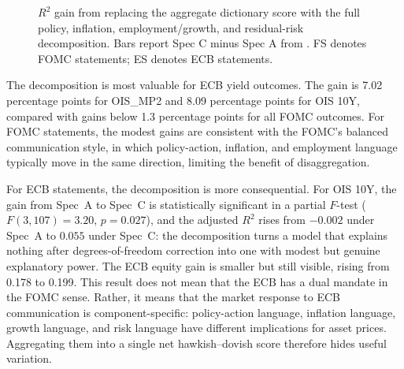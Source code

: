 \begin{figure}[H]
  \centering
  \caption[$R^2$ gains from decomposing dictionary tone]{$R^2$ gain from
    replacing the aggregate dictionary score with the full policy, inflation,
    employment/growth, and residual-risk decomposition. Bars report Spec C
    minus Spec A from . FS denotes FOMC
    statements; ES denotes ECB statements.}
  \label{fig:dual_mandate_r2_gains_v31}
\end{figure}


The decomposition is most valuable for ECB yield outcomes. The gain is 7.02
percentage points for OIS\_MP2 and 8.09 percentage points for OIS 10Y,
compared with gains below 1.3 percentage points for all FOMC outcomes. For
FOMC statements, the modest gains are consistent with the FOMC's balanced
communication style, in which policy-action, inflation, and employment
language typically move in the same direction, limiting the benefit of
disaggregation.

For ECB statements, the decomposition is more consequential. For OIS 10Y,
the gain from Spec~A to Spec~C is statistically significant in a partial
$F$-test ($F(3,107)=3.20$, $p=0.027$), and the adjusted $R^2$ rises from
$-0.002$ under Spec~A to $0.055$ under Spec~C: the decomposition turns a
model that explains nothing after degrees-of-freedom correction into one with
modest but genuine explanatory power. The ECB equity gain is smaller but still
visible, rising from 0.178 to 0.199. This result does not mean that the ECB
has a dual mandate in the FOMC sense. Rather, it means that the market
response to ECB communication is component-specific: policy-action language,
inflation language, growth language, and risk language have different
implications for asset prices. Aggregating them into a single net
hawkish--dovish score therefore hides useful variation.

